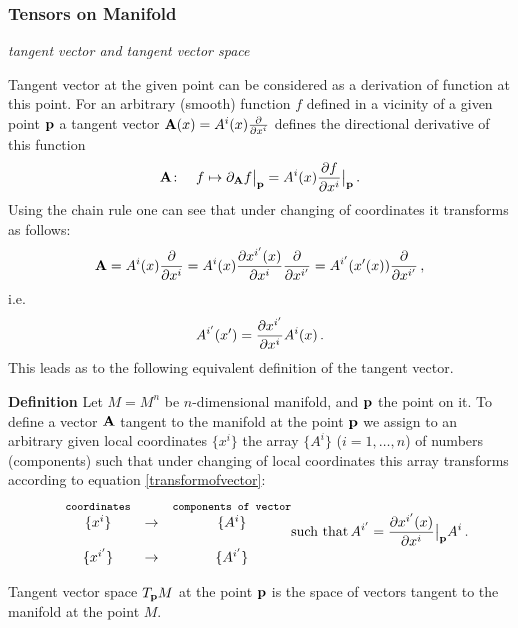 \documentclass[12pt]{article}
\theoremstyle{theorem}
\numberwithin{equation}{section}
\begin{document}
  \subsubsection{ Tensors on Manifold}


{\it tangent vector and tangent vector space}

\smallskip

 Tangent vector at the given point
can be considered as a derivation of function at this point.
  For an arbitrary (smooth)
function $f$ defined in a vicinity of a given 
 point ${\bf p}$ a tangent vector ${\bf A}(x)=A^i(x){\partial\over \partial x^i}$
defines the directional derivative of this function 
      \begin{equation*} 
 {\bf A}\colon \quad 
   f \mapsto  \partial_{\bf A} f\big\vert_{\bf p}=A^i(x)
{\partial f\over \partial x^i}\big\vert_{{\bf p}}\,.    
      \end{equation*} 
Using the chain rule 
one can see that
under changing of coordinates 
it transforms as follows: 
             $$
         {\bf A}=A^i(x){\partial\over \partial x^i}=
A^i(x){\partial x^{i'}(x)\over \partial x^i}{\partial\over \partial x^{i'}}=
         A^{i'}(x'(x)){\partial\over \partial x^{i'}}\,,
             $$
i.e.
            \begin{equation}\label{transformofvector}
                   A^{i'}(x')={\partial x^{i'}\over \partial x^i}A^i(x)\,.
            \end{equation}
     This leads as to the following equivalent definition
of the tangent vector.

{\bf Definition}   Let $M=M^n$ be $n$-dimensional
manifold, and ${\bf p}$ the point on it.
To define a  vector ${\bf A}$ tangent to the 
manifold  at the point ${\bf p}$
we assign to an
arbitrary   
given local coordinates $\{x^i\}$
the array $\{A^i\}$ ($i=1,\dots,n$)
of numbers (components) 
such that under changing of local coordinates
this array  transforms  according to equation
\eqref{transformofvector}: 
         \begin{equation}\label{definitionofvector}
  \begin{matrix}
&\hbox{{\tt {\footnotesize coordinates}}}
 &            
&\hbox{{\tt {\footnotesize components of vector}}}\cr
&\{x^i\}   &\rightarrow
     &   \{A^i\}\cr
 &&&\cr
&\{x^{i'}\}   &\rightarrow
     &   \{A^{i'}\}\cr
      \end{matrix}\hbox{such that}\, 
      A^{i'}=
{\partial x^{i'}(x)\over \partial x^i}\big\vert_{\bf p}  A^i\,.  
        \end{equation}


Tangent vector space $T_{\bf p} M$  at the point ${\bf p}$ is
the space of vectors tangent to the manifold at 
the point $M$.
\end{document}
